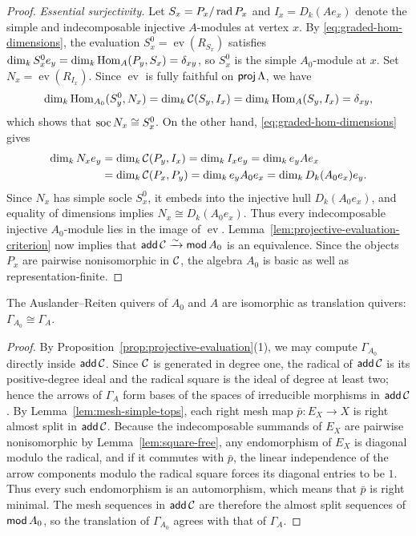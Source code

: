 \begin{proof}
\emph{Essential surjectivity.}
Let $S_x=P_x/\operatorname{rad} P_x$ and $I_x=D_k(Ae_x)$ denote the simple and
indecomposable injective $A$-modules at vertex $x$. By
\eqref{eq:graded-hom-dimensions}, the evaluation $S_x^0=\operatorname{ev}(R_{S_x})$
satisfies $\dim_k S_x^0 e_y=\dim_k\operatorname{Hom}_A(P_y,S_x)=\delta_{xy}$, so $S_x^0$ is
the simple $A_0$-module at $x$. Set $N_x=\operatorname{ev}(R_{I_x})$. Since
$\operatorname{ev}$ is fully faithful on $\operatorname{\mathsf{proj}}\Lambda$, we have
\[
 \dim_k\operatorname{Hom}_{A_0}(S_y^0,N_x)=\dim_k\mathcal C(S_y,I_x)=\dim_k\operatorname{Hom}_A(S_y,I_x)=\delta_{xy},
\]
which shows that $\operatorname{soc} N_x\cong S_x^0$. On the other hand,
\eqref{eq:graded-hom-dimensions} gives
\[
 \begin{aligned}
 \dim_k N_xe_y&=\dim_k\mathcal C(P_y,I_x)=\dim_k I_xe_y=\dim_k e_yAe_x\\
 &=\dim_k\mathcal C(P_x,P_y)=\dim_k e_yA_0e_x=\dim_k D_k(A_0 e_x)e_y.
 \end{aligned}
\]
Since $N_x$ has simple socle $S_x^0$, it embeds into the injective hull
$D_k(A_0 e_x)$, and equality of dimensions implies $N_x\cong D_k(A_0 e_x)$.
Thus every indecomposable injective $A_0$-module lies in the image of
$\operatorname{ev}$. Lemma~\ref{lem:projective-evaluation-criterion} now
implies that $\operatorname{\mathsf{add}}\mathcal C\xrightarrow{\sim}\operatorname{\mathsf{mod}} A_0$ is an equivalence. Since
the objects $P_x$ are pairwise nonisomorphic in $\mathcal C$, the algebra $A_0$ is
basic as well as representation-finite.
\end{proof}

\begin{corollary}
\label{cor:same-ar-quiver}
The Auslander--Reiten quivers of $A_0$ and $A$ are isomorphic as translation
quivers: $\Gamma_{A_0}\cong\Gamma_A$.
\end{corollary}
\begin{proof}
By Proposition~\ref{prop:projective-evaluation}(1), we may compute
$\Gamma_{A_0}$ directly inside $\operatorname{\mathsf{add}}\mathcal C$. Since $\mathcal C$ is generated in degree
one, the radical of $\operatorname{\mathsf{add}}\mathcal C$ is its positive-degree ideal and the radical
square is the ideal of degree at least two; hence the arrows of $\Gamma_A$
form bases of the spaces of irreducible morphisms in $\operatorname{\mathsf{add}}\mathcal C$. By
Lemma~\ref{lem:mesh-simple-tops}, each right mesh map $\bar p:E_X\to X$ is
right almost split in $\operatorname{\mathsf{add}}\mathcal C$. Because the indecomposable summands of $E_X$
are pairwise nonisomorphic by Lemma~\ref{lem:square-free}, any endomorphism
of $E_X$ is diagonal modulo the radical, and if it commutes with $\bar p$,
the linear independence of the arrow components modulo the radical square
forces its diagonal entries to be $1$. Thus every such endomorphism is an
automorphism, which means that $\bar p$ is right minimal. The mesh sequences
in $\operatorname{\mathsf{add}}\mathcal C$ are therefore the almost split sequences of $\operatorname{\mathsf{mod}} A_0$, so the
translation of $\Gamma_{A_0}$ agrees with that of $\Gamma_A$.
\end{proof}

